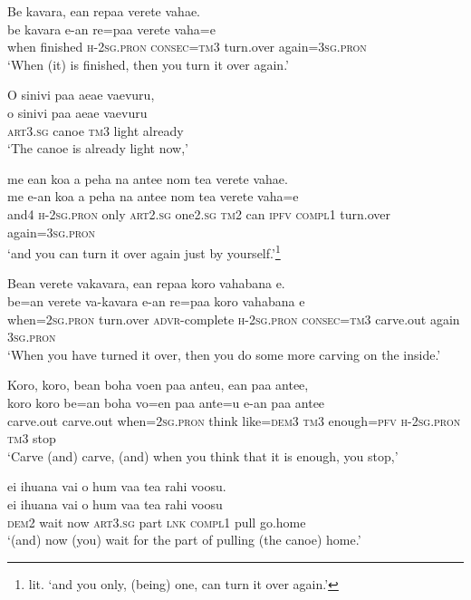 \ea\label{ex:text18-28}
Be kavara, ean repaa verete vahae.\\
\gll be	kavara	e-an	re=paa	verete	vaha=e\\
     when	finished	\textsc{h}-2\textsc{sg}.\textsc{pron}	\textsc{consec}=\textsc{tm}3	turn.over	again=3\textsc{sg}.\textsc{pron}\\
\glt `When (it) is finished, then you turn it over again.'
\z

\ea\label{ex:text18-29}
O sinivi paa aeae vaevuru,\\
\gll o	sinivi	paa	aeae	vaevuru\\
     \textsc{art}3.\textsc{sg}	canoe	\textsc{tm}3	light	already\\
\glt `The canoe is already light now,'
\z

\ea\label{ex:text18-30}
me ean koa a peha na antee nom tea verete vahae.\\
\gll me	e-an	koa	a	peha	na	antee	nom	tea	verete	vaha=e\\
     and4	\textsc{h}-2\textsc{sg}.\textsc{pron}	only	\textsc{art}2.\textsc{sg}	one2.\textsc{sg}	\textsc{tm}2	can	\textsc{ipfv}	\textsc{compl}1	turn.over	again=3\textsc{sg}.\textsc{pron}\\
\glt `and you can turn it over again just by yourself.'\footnote{lit. `and you only, (being) one, can turn it over again.'}
\z

\ea\label{ex:text18-31}
Bean verete vakavara, ean repaa koro vahabana e.\\
\gll be=an	verete	va-kavara	e-an	re=paa	koro	vahabana	e\\
     when=2\textsc{sg}.\textsc{pron}	turn.over	\textsc{advr}-complete	\textsc{h}-2\textsc{sg}.\textsc{pron}	\textsc{consec}=\textsc{tm}3	carve.out	again	3\textsc{sg}.\textsc{pron}\\
\glt `When you have turned it over, then you do some more carving on the inside.'
\z

\ea\label{ex:text18-32}
Koro, koro, bean boha voen paa anteu, ean paa antee,\\
\gll koro	koro	be=an	boha	vo=en	paa	ante=u	e-an	paa	antee\\
     carve.out	carve.out	when=2\textsc{sg}.\textsc{pron}	think	like=\textsc{dem}3	\textsc{tm}3	enough=\textsc{pfv}	\textsc{h}-2\textsc{sg}.\textsc{pron}	\textsc{tm}3	stop\\
\glt `Carve (and) carve, (and) when you think that it is enough, you stop,'
\z

\ea\label{ex:text18-33}
ei ihuana vai o hum vaa tea rahi voosu.\\
\gll ei	ihuana	vai	o	hum	vaa	tea	rahi	voosu\\
     \textsc{dem}2	wait	now	\textsc{art}3.\textsc{sg}	part	\textsc{lnk}	\textsc{compl}1	pull	go.home\\
\glt `(and) now (you) wait for the part of pulling (the canoe) home.'
\z

